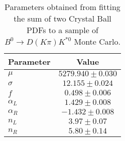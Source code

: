 \begin{table}[h]
  \centering
  \begin{tabular}{lc}
      \toprule
      Parameter & Value \\
      \midrule
      $\mu$ & $5279.940 \pm 0.030$ \\
      $\sigma$ & $12.155 \pm 0.024$ \\
      $f$ & $0.498 \pm 0.006$ \\
      $\alpha_L$ & $1.429 \pm 0.008$ \\
      $\alpha_R$ & $-1.432 \pm 0.008$ \\
      $n_L$ & $3.97 \pm 0.07$ \\
      $n_R$ & $5.80 \pm 0.14$ \\
  \bottomrule
  \end{tabular}
  \caption{Parameters obtained from fitting the sum of two Crystal Ball PDFs to a sample of $B^0 \to D(K\pi)K^{*0}$ Monte Carlo.}
\label{tab:signal_Kpi_MC_params}
\end{table}
